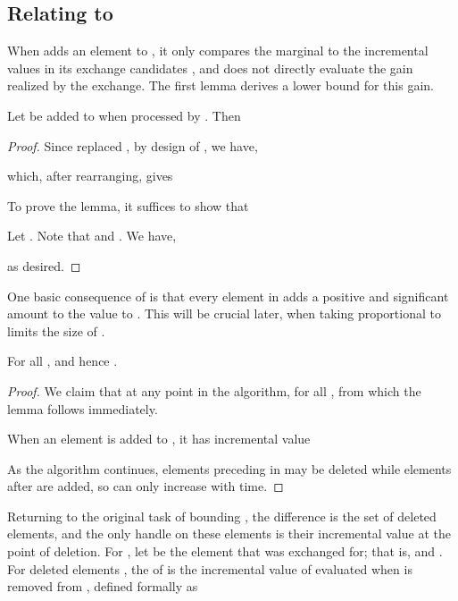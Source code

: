 \documentclass[oneside,letterpaper]{scrartcl} \usepackage{macros}
\begin{document}
\subsection{Relating  to }
\newcommand{\exitvalueof}{\chi\parof}

When  adds an element  to , it only
compares the marginal  to the incremental values in its
exchange candidates , and does not directly evaluate the gain  realized by the exchange. The first lemma
derives a lower bound for this gain.
\begin{lemma}
  Let  be added to  when processed by
  . Then
  
\end{lemma}
\begin{proof}
  Since  replaced , by design of
  , we have,
  
  which, after rearranging, gives
  
  To prove the lemma, it suffices to show that
  
  Let . Note that  and . We have,
  
  as desired.
\end{proof}
One basic consequence of 
is that every element in  adds a positive and significant
amount  to the value to . This will be crucial later, when
taking  proportional to  limits the size of .
\begin{lemma} For all ,  and hence
  .
\end{lemma}
\begin{proof}
  We claim that at any point in the algorithm,  for all , from which the lemma follows
   immediately.

  When an element  is added to , it has incremental
  value
  
  As the algorithm continues, elements preceding  in  may be
  deleted while elements after  are added, so
   can only increase with time.
\end{proof}
Returning to the original task of bounding , the difference
 is the set of deleted elements, and the
only handle on these elements is their incremental value at the point
of deletion. For , let  be the
element that  was exchanged for; that is, 
and . For deleted elements , the   of
 is the incremental value of  evaluated when
 is removed from , defined formally as
\end{document}
